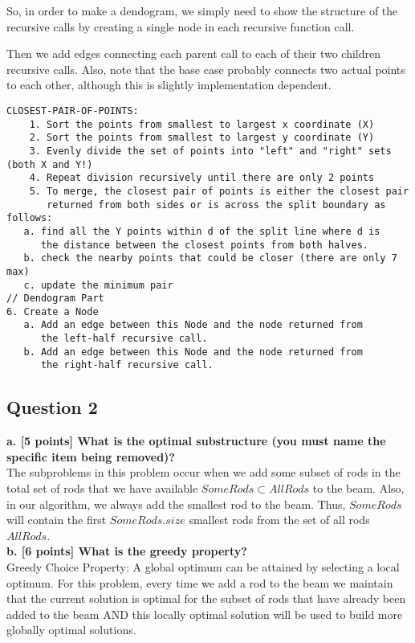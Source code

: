 \documentclass[12pt]{article}
\begin{document}
So, in order to make a dendogram, we simply need to show the structure of the recursive calls by 
creating a single node in each recursive function call. 

Then we add edges connecting each parent call to each of their two children recursive calls. 
Also, note that the base case probably connects two actual points to each other, 
although this is slightly implementation dependent.

\begin{verbatim}
CLOSEST-PAIR-OF-POINTS:
	1. Sort the points from smallest to largest x coordinate (X)
	2. Sort the points from smallest to largest y coordinate (Y)
	3. Evenly divide the set of points into "left" and "right" sets (both X and Y!)
	4. Repeat division recursively until there are only 2 points
	5. To merge, the closest pair of points is either the closest pair 
	   returned from both sides or is across the split boundary as follows:
   a. find all the Y points within d of the split line where d is 
      the distance between the closest points from both halves.
   b. check the nearby points that could be closer (there are only 7 max)
   c. update the minimum pair 
// Dendogram Part
6. Create a Node 
   a. Add an edge between this Node and the node returned from 
      the left-half recursive call.
   b. Add an edge between this Node and the node returned from 
      the right-half recursive call.
\end{verbatim}

\subsection*{Question 2}
\textbf{a. [5 points] What is the optimal substructure (you must name the specific item being removed)?} \\

The subproblems in this problem occur when we add some subset of rods in the total set of rods that we have available $SomeRods \subset AllRods$ to the beam. Also, in our algorithm, we always add the smallest rod to the beam. Thus, $SomeRods$ will contain the first $SomeRods.size$ smallest rods from the set of all rods $AllRods$.  \\

\noindent \textbf{b. [6 points] What is the greedy property? } \\

Greedy Choice Property: A global optimum can be attained by selecting a local optimum. For this problem, every time we add a rod to the beam we maintain that the current solution is optimal for the subset of rods that have already been added to the beam AND this locally optimal solution will be used to build more globally optimal solutions.  \\
\end{document}
